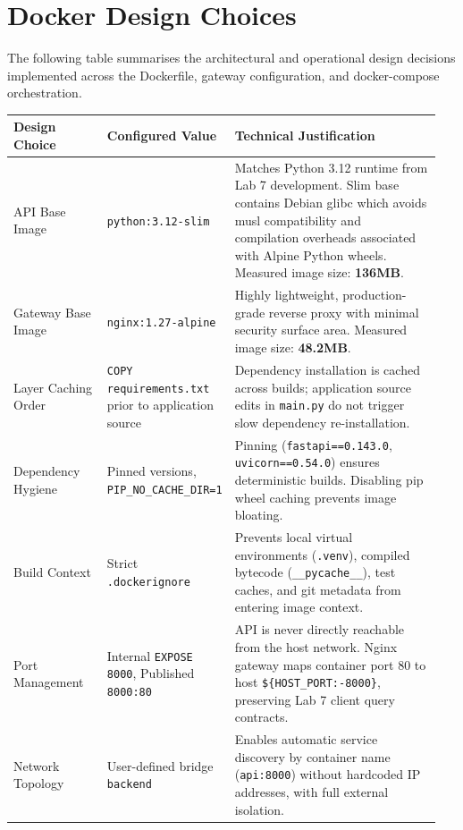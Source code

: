 \documentclass[10pt,a4paper]{article}
\begin{document}
\section{Docker Design Choices}

The following table summarises the architectural and operational design decisions implemented across the Dockerfile, gateway configuration, and docker-compose orchestration.

\begin{table}[H]
\centering
\scriptsize
\begin{tabular}{p{0.22\linewidth} p{0.24\linewidth} p{0.49\linewidth}}
\toprule
\textbf{Design Choice} & \textbf{Configured Value} & \textbf{Technical Justification} \\
\midrule
API Base Image & \texttt{python:3.12-slim} & Matches Python 3.12 runtime from Lab 7 development. Slim base contains Debian glibc which avoids musl compatibility and compilation overheads associated with Alpine Python wheels. Measured image size: \textbf{136MB}. \\
\addlinespace
Gateway Base Image & \texttt{nginx:1.27-alpine} & Highly lightweight, production-grade reverse proxy with minimal security surface area. Measured image size: \textbf{48.2MB}. \\
\addlinespace
Layer Caching Order & \texttt{COPY requirements.txt} prior to application source & Dependency installation is cached across builds; application source edits in \texttt{main.py} do not trigger slow dependency re-installation. \\
\addlinespace
Dependency Hygiene & Pinned versions, \texttt{PIP\_NO\_CACHE\_DIR=1} & Pinning (\texttt{fastapi==0.143.0}, \texttt{uvicorn==0.54.0}) ensures deterministic builds. Disabling pip wheel caching prevents image bloating. \\
\addlinespace
Build Context & Strict \texttt{.dockerignore} & Prevents local virtual environments (\texttt{.venv}), compiled bytecode (\texttt{\_\_pycache\_\_}), test caches, and git metadata from entering image context. \\
\addlinespace
Port Management & Internal \texttt{EXPOSE 8000}, Published \texttt{8000:80} & API is never directly reachable from the host network. Nginx gateway maps container port 80 to host \texttt{\$\{HOST\_PORT:-8000\}}, preserving Lab 7 client query contracts. \\
\addlinespace
Network Topology & User-defined bridge \texttt{backend} & Enables automatic service discovery by container name (\texttt{api:8000}) without hardcoded IP addresses, with full external isolation. \\

\end{tabular}
\end{table}
\end{document}

